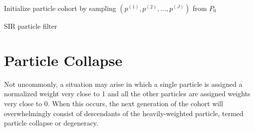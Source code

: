     \begin{algorithm}[H]

        \BlankLine

        \DontPrintSemicolon


        \BlankLine

        Initialize particle cohort by sampling $(p^{(1)}, p^{(2)}, ..., p^{(J)})$ from $P_0$

        \BlankLine


        \BlankLine


        \BlankLine

        \caption{SIR particle filter}\label{pfsir}

    \end{algorithm}

\section{Particle Collapse}

	Not uncommonly, a situation may arise in which a single particle is assigned a normalized weight very close to 1 and all the other particles are assigned weights very close to 0. When this occurs, the next generation of the cohort will overwhelmingly consist of descendants of the heavily-weighted particle, termed particle collapse or degeneracy.

